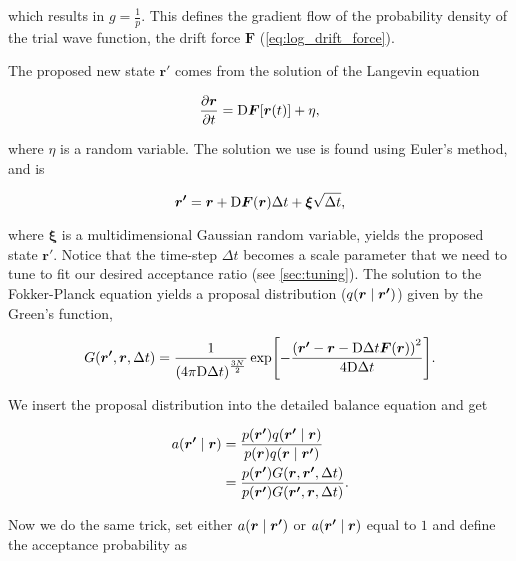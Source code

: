which results in $g=\frac{1}{p}$. This defines the gradient flow of the probability density of the trial wave function, the drift force $\bm{F}$ (\autoref{eq:log_drift_force}). 

The proposed new state $\bm{r'}$ comes from the solution of the Langevin equation 

\begin{equation}\label{eq:langevin}
    \pdv{\bm{r}}{t} = \mathrm{D}\bm{F}\qty[\bm{r}(t)] + \eta, 
\end{equation}

where $\eta$ is a random variable. The solution we use is found using Euler's method, and is 

\begin{equation}
    \bm{r'} = \bm{r} + \mathrm{D}\bm{F}\qty(\bm{r})\Delta t + \bm{\xi}\sqrt{\Delta t},
\end{equation}

where $\bm{\xi}$ is a multidimensional Gaussian random variable, yields the proposed state $\bm{r'}$. Notice that the time-step $\Delta t$ becomes a scale parameter that we need to tune to fit our desired acceptance ratio (see \autoref{sec:tuning}). The solution to the Fokker-Planck equation yields a proposal distribution ($q\qty(\bm{r}\mid\bm{r'})$) given by the Green's function,  


\begin{equation}
    G\qty(\bm{r'}, \bm{r}, \Delta t) = \frac{1}{\qty(4\pi\mathrm{D}\Delta t)^{\frac{3N}{2}}}\exp[-\frac{\qty(\bm{r'}-\bm{r}-\mathrm{D}\Delta t\bm{F}\qty(\bm{r}))^2}{4\mathrm{D}\Delta t}].
\end{equation}

We insert the proposal distribution into the detailed balance equation and get 

\begin{align*}
    a\qty(\bm{r'}\mid\bm{r})&= \frac{p\qty({\bm{r'}})q\qty(\bm{r'}\mid\bm{r})}{p\qty({\bm{r}})q\qty(\bm{r}\mid\bm{r'})}
    \\
    &= \frac{p\qty({\bm{r'}})G\qty(\bm{r}, \bm{r'}, \Delta t)}{p\qty({\bm{r'}})G\qty(\bm{r'}, \bm{r}, \Delta t)}.
\end{align*}

Now we do the same trick, set either $a\qty(\bm{r}\mid\bm{r'})$ or $a\qty({\bm{r'}\mid\bm{r}})$ equal to $1$ and define the acceptance probability as 


